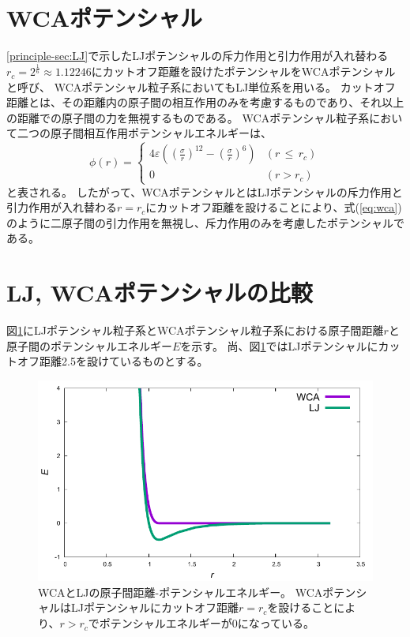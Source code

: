 \documentclass[titlepage]{jsreport}
\begin{document}
\section{WCAポテンシャル}\label{principle-sec:WCA}
\ref{principle-sec:LJ}で示したLJポテンシャルの斥力作用と引力作用が入れ替わる$r_c=2^{\frac{1}{6}}{\approx}1.12246$にカットオフ距離を設けたポテンシャルをWCAポテンシャルと呼び、
WCAポテンシャル粒子系においてもLJ単位系を用いる。
カットオフ距離とは、その距離内の原子間の相互作用のみを考慮するものであり、それ以上の距離での原子間の力を無視するものである\cite{cutoff}。
WCAポテンシャル粒子系において二つの原子間相互作用ポテンシャルエネルギーは、
\large
\begin{equation}
\phi(r) = \left\{ \begin{array}{ll}
    4{\varepsilon}\left(\left(\frac{\sigma}{r}\right)^{12}-\left(\frac{\sigma}{r}\right)^6\right) & (r\,{\leq}\,{r_c}) \\
    0 & (r>r_c)\label{eq:wca}
\end{array} \right.
\end{equation}
\normalsize
と表される\cite{wca}。
したがって、WCAポテンシャルとはLJポテンシャルの斥力作用と引力作用が入れ替わる$r=r_c$にカットオフ距離を設けることにより、式(\ref{eq:wca})のように二原子間の引力作用を無視し、斥力作用のみを考慮したポテンシャルである。


\section{LJ, WCAポテンシャルの比較}\label{principle-sec:LJ-WCA}
図\ref{fig:dis-poen}にLJポテンシャル粒子系とWCAポテンシャル粒子系における原子間距離$r$と原子間のポテンシャルエネルギー$E$を示す。
尚、図\ref{fig:dis-poen}ではLJポテンシャルにカットオフ距離2.5を設けているものとする。

\newpage
\begin{figure}[htbp]
    \begin{center}
        \includegraphics[width=14cm]{fig/dis-poen.pdf}
    \end{center}
    \caption{WCAとLJの原子間距離-ポテンシャルエネルギー。
    WCAポテンシャルはLJポテンシャルにカットオフ距離$r=r_c$を設けることにより、$r>r_c$でポテンシャルエネルギーが0になっている。}
    \label{fig:dis-poen}
\end{figure}
\end{document}
